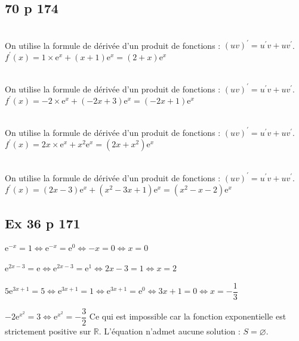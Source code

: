 \documentclass[12pt,a4paper]{book}
\begin{document}
\subsection*{70 p 174}
\begin{enumMet}
	\item {}\\
	On utilise la formule de dérivée d'un produit de fonctions : $(u v)^{\prime}=u^{\prime} v+u v^{\prime}$.\\
	$f^{\prime}(x)=1 \times \mathrm{e}^x+(x+1) \mathrm{e}^x=(2+x) \mathrm{e}^x$
	\item {}\\
	On utilise la formule de dérivée d'un produit de fonctions : $(u v)^{\prime}=u^{\prime} v+u v^{\prime}$.\\
	$f^{\prime}(x)=-2 \times \mathrm{e}^x+(-2 x+3) \mathrm{e}^x=(-2 x+1) \mathrm{e}^x$
	\item {}\\
	On utilise la formule de dérivée d'un produit de fonctions : $(u v)^{\prime}=u^{\prime} v+u v^{\prime}$.\\
	$f^{\prime}(x)=2 x \times \mathrm{e}^x+x^2 \mathrm{e}^x=\left(2 x+x^2\right) \mathrm{e}^x$
	\item {}\\
	On utilise la formule de dérivée d'un produit de fonctions : $(u v)^{\prime}=u^{\prime} v+u v^{\prime}$.\\
	$f^{\prime}(x)=(2 x-3) \mathrm{e}^x+\left(x^2-3 x+1\right) \mathrm{e}^x=\left(x^2-x-2\right) \mathrm{e}^x$
\end{enumMet}

\subsection*{Ex 36 p 171}
\begin{enumMet}
    \item $\mathrm{e}^{-x}=1 \Leftrightarrow \mathrm{e}^{-x}=\mathrm{e}^{0} \Leftrightarrow-x=0 \Leftrightarrow x=0$
    \item $\mathrm{e}^{2 x-3}=\mathrm{e} \Leftrightarrow \mathrm{e}^{2 x-3}=\mathrm{e}^{1} \Leftrightarrow 2 x-3=1 \Leftrightarrow x=2$
    \item $5 \mathrm{e}^{3 x+1}=5 \Leftrightarrow \mathrm{e}^{3 x+1}=1 \Leftrightarrow \mathrm{e}^{3 x+1}=\mathrm{e}^{0} \Leftrightarrow 3 x+1=0 \Leftrightarrow x=-\dfrac{1}{3}$
    \item $-2 \mathrm{e}^{x^{2}}=3 \Leftrightarrow \mathrm{e}^{x^{2}}=-\dfrac{3}{2}$
    Ce qui est impossible car la fonction exponentielle est strictement positive sur $\mathbb{R}$. L'équation n'admet aucune solution : $S=\varnothing$.
\end{enumMet}
\end{document}
